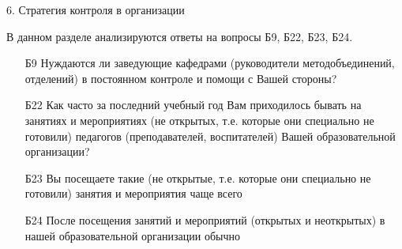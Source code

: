 \begin{frame}{6. Стратегия контроля в организации}

\tiny

В данном разделе анализируются ответы на вопросы Б9, Б22, Б23, Б24.
\bigskip

\begin{itemize}

\item [Б9] Нуждаются ли заведующие кафедрами  (руководители методобъединений, отделений) в постоянном контроле и помощи с Вашей стороны?

\item [Б22] Как часто за последний учебный год Вам приходилось бывать на занятиях и мероприятиях (не открытых, т.е. которые они специально не готовили) педагогов (преподавателей, воспитателей) Вашей образовательной организации?

\item [Б23] Вы посещаете такие (не открытые, т.е. которые они специально не готовили) занятия и мероприятия чаще всего

\item [Б24] После посещения занятий  и мероприятий (открытых и неоткрытых)  в нашей образовательной организации  обычно

\end{itemize}

\end{frame}


